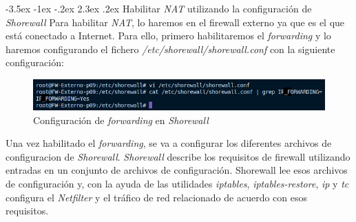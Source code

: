 \documentclass[11pt]{report}
\makeatletter
\renewcommand\chapter{\@startsection{chapter}{0}{\z@}%
    {-3.5ex \@plus -1ex \@minus -.2ex}%
    {2.3ex \@plus.2ex}%
    {\normalfont\Large\bfseries}}
\makeatother
\begin{document}
\cleardoublepage

\chapter{Habilitar \emph{NAT} utilizando la configuración de \emph{Shorewall}}
Para habilitar \emph{NAT}, lo haremos en el firewall externo ya que es el que está conectado 
a Internet. Para ello, primero habilitaremos el \emph{forwarding} y lo haremos configurando el
fichero \emph{/etc/shorewall/shorewall.conf} con la siguiente configuración:
\begin{figure}[H]
  \centering
  \includegraphics[scale=0.7]{img/forwarding_shorewall.png}
  \caption{Configuración de \emph{forwarding} en \emph{Shorewall}}
  \label{fig:Configuracion de forwarding en Shorewall}
\end{figure}

Una vez habilitado el \emph{forwarding}, se va a configurar los diferentes archivos de configuracion
de \emph{Shorewall}. \emph{Shorewall} describe los requisitos de firewall utilizando entradas en un 
conjunto de archivos de configuración. Shorewall lee esos archivos de configuración y, 
con la ayuda de las utilidades \emph{iptables}, \emph{iptables-restore}, \emph{ip} y \emph{tc} configura 
el \emph{Netfilter} y el tráfico de red relacionado de acuerdo con esos requisitos.
\end{document}

